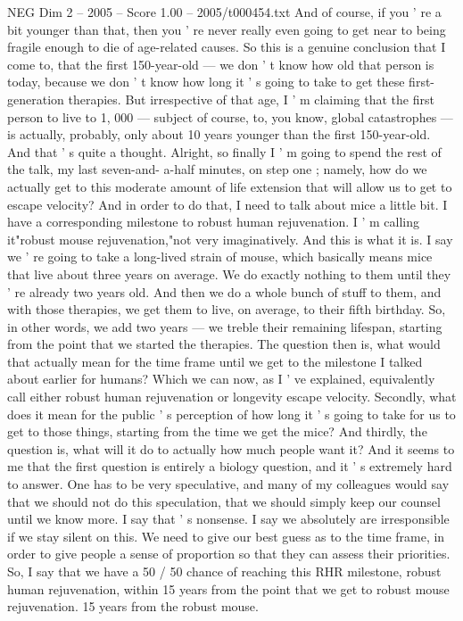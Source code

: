 \begin{textsample}{NEG Dim 2 – 2005 – Score 1.00 – 2005/t000454.txt}
And of course, if you ' re a bit younger than that, then you ' re never really even going to get near to being fragile enough to die of age-related causes.
So this is a genuine conclusion that I come to, that the first 150-year-old — we don ' t know how old that person is today, because we don ' t know how long it ' s going to take to get these first-generation therapies.
But irrespective of that age, I ' m claiming that the first person to live to 1, 000 — subject of course, to, you know, global catastrophes — is actually, probably, only about 10 years younger than the first 150-year-old.
And that ' s quite a thought.
Alright, so finally I ' m going to spend the rest of the talk, my last seven-and- a-half minutes, on step one ; namely, how do we actually get to this moderate amount of life extension that will allow us to get to escape velocity?
And in order to do that, I need to talk about mice a little bit.
I have a corresponding milestone to robust human rejuvenation.
I ' m calling it"robust mouse rejuvenation,"not very imaginatively.
And this is what it is.
I say we ' re going to take a long-lived strain of mouse, which basically means mice that live about three years on average.
We do exactly nothing to them until they ' re already two years old.
And then we do a whole bunch of stuff to them, and with those therapies, we get them to live, on average, to their fifth birthday.
So, in other words, we add two years — we treble their remaining lifespan, starting from the point that we started the therapies.
The question then is, what would that actually mean for the time frame until we get to the milestone I talked about earlier for humans?
Which we can now, as I ' ve explained, equivalently call either robust human rejuvenation or longevity escape velocity.
Secondly, what does it mean for the public ' s perception of how long it ' s going to take for us to get to those things, starting from the time we get the mice?
And thirdly, the question is, what will it do to actually how much people want it?
And it seems to me that the first question is entirely a biology question, and it ' s extremely hard to answer.
One has to be very speculative, and many of my colleagues would say that we should not do this speculation, that we should simply keep our counsel until we know more.
I say that ' s nonsense.
I say we absolutely are irresponsible if we stay silent on this.
We need to give our best guess as to the time frame, in order to give people a sense of proportion so that they can assess their priorities.
So, I say that we have a 50 / 50 chance of reaching this RHR milestone, robust human rejuvenation, within 15 years from the point that we get to robust mouse rejuvenation. 15 years from the robust mouse.

\end{textsample}
